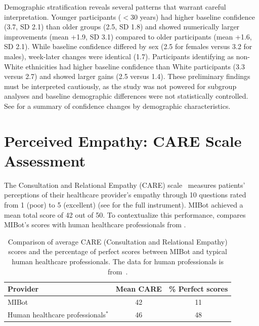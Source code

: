 Demographic stratification reveals several patterns that warrant careful interpretation. Younger participants ($<30$ years) had higher baseline confidence (3.7, SD 2.1) than older groups (2.5, SD 1.8) and showed numerically larger improvements (mean +1.9, SD 3.1) compared to older participants (mean +1.6, SD 2.1). While baseline confidence differed by sex (2.5 for females versus 3.2 for males), week-later changes were identical (1.7). Participants identifying as non-White ethnicities had higher baseline confidence than White participants (3.3 versus 2.7) and showed larger gains (2.5 versus 1.4). These preliminary findings must be interpreted cautiously, as the study was not powered for subgroup analyses and baseline demographic differences were not statistically controlled. See  for a summary of confidence changes by demographic characteristics.


\section{Perceived Empathy: CARE Scale Assessment}
\label{sec:perceived-empathy}

The Consultation and Relational Empathy (CARE) scale~\citep{10.1093/fampra/cmh621} measures patients' perceptions of their healthcare provider's empathy through 10 questions rated from 1 (poor) to 5 (excellent) (see  for the full instrument). MIBot achieved a mean total score of 42 out of 50. To contextualize this performance,  compares MIBot's scores with human healthcare professionals from \citet{Bikker2015}.

\begin{table}[ht]
	\centering
	\small
	\setlength{\tabcolsep}{4pt}
	\renewcommand{\arraystretch}{1.1}
	\begin{tabular}{@{}lcc@{}}
		\toprule
		\textbf{Provider}                  & \textbf{Mean CARE} & \textbf{\% Perfect scores} \\
		\midrule
		MIBot                              & 42                 & 11                         \\
		Human healthcare professionals$^*$ & 46                 & 48                         \\
		\bottomrule
	\end{tabular}
	\caption[MIBot vs. Human CARE Scores]{Comparison of average CARE (Consultation and Relational Empathy) scores and the percentage of perfect scores between MIBot and typical human healthcare professionals. The data for human professionals is from~\cite{Bikker2015}.}
	\label{table:care_comparison}
\end{table}

